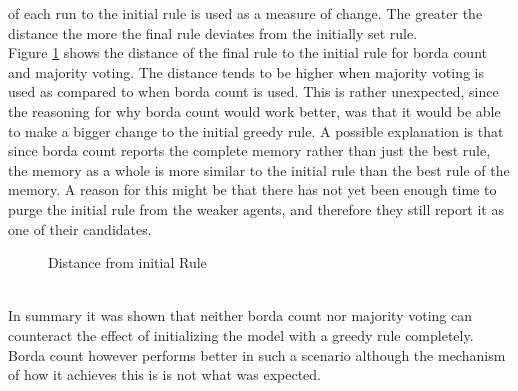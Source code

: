 \documentclass[a4paper]{article}
\begin{document}
of each run to the initial rule is used as a measure of change. The greater the distance the more the final rule deviates from 
the initially set rule. \\
Figure \ref{d_distance} shows the distance of the final rule to the initial rule for borda count and majority voting. The distance tends
to be higher when majority voting is used as compared to when borda count is used. This is rather unexpected, since the reasoning for
why borda count would work better, was that it would be able to make a bigger change to the initial greedy rule. 
A possible explanation is that since borda count reports the complete memory rather than just the best rule, the 
memory as a whole is more similar to the initial rule than the best rule of the memory. A reason for this might be 
that there has not yet been enough time to purge the initial rule from the weaker agents, and therefore they still 
report it as one of their candidates. \\
\begin{figure}[!ht]
\caption{Distance from initial Rule}
\label{d_distance}
\end{figure}\\
In summary it was shown that neither borda count nor majority voting can counteract the effect of initializing 
the model with a greedy rule completely. Borda count however performs better in such a scenario although the 
mechanism of how it achieves this is is not what was expected. 
\clearpage
\end{document}
